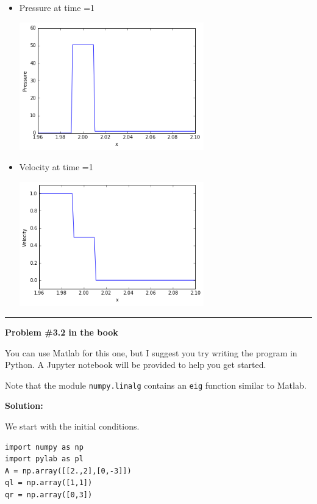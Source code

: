 \documentclass[11pt]{article}
\begin{document}
\begin{enumerate}[label=(\alph*)]
\begin{itemize}
			\item  Pressure at time =1
			\begin{minipage}{\linewidth}
				\centering
				\includegraphics[width=8cm]{prf.png}
			\end{minipage}
			\item Velocity at time =1
			\begin{minipage}{\linewidth}
				\centering
				\includegraphics[width=8cm]{vf.png}
			\end{minipage}
		\end{itemize}			
\end{enumerate}



\vskip 1cm
\hrule
{\bf Problem \#3.2 in the book}

You can use Matlab for this one, but I suggest you try writing the program 
in Python.  A Jupyter notebook will be provided to help you get started.

Note that the module {\tt numpy.linalg} contains an {\tt eig}
function similar to Matlab.

\vskip 1cm
{\bf Solution:}

We start with the initial conditions.

\begin{lstlisting}[style=MyPythonstyle]
import numpy as np
import pylab as pl
A = np.array([[2.,2],[0,-3]])
ql = np.array([1,1])
qr = np.array([0,3])
\end{lstlisting}
\end{document}
